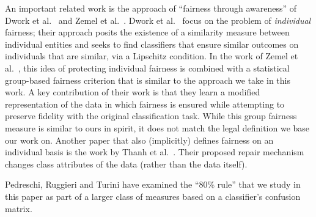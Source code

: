 An important related work is the approach of ``fairness through awareness'' of Dwork et al.~\cite{Dwork12Fairness} and Zemel et al.~\cite{icml2013_zemel13}. Dwork et al.~\cite{Dwork12Fairness} focus on the problem of \emph{individual} fairness; their approach posits the existence of a similarity measure between individual entities and seeks to find classifiers that ensure similar outcomes on individuals that are similar, via a Lipschitz condition. In the work of Zemel et al.~\cite{icml2013_zemel13}, this idea of protecting individual fairness is combined with a statistical group-based fairness criterion that is similar to the approach we take in this work. A key contribution of their work is that they learn a modified representation of the data in which fairness is ensured while attempting to preserve fidelity with the original classification task.  While this group fairness measure  is similar to ours in spirit, it does not match the legal definition we base our work on. Another paper that also (implicitly) defines fairness on an individual basis is the work by Thanh et al.~\cite{luong2011knn}. Their proposed repair mechanism changes class attributes of the data (rather than the data itself). 

Pedreschi, Ruggieri and Turini \cite{pedreschi2012study,pedreschi2009integrating} have examined the ``80\% rule'' that we study in this paper as part of a larger class of measures based on a classifier's confusion matrix. 

